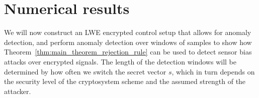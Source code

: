 \documentclass[journal, twoside, web]{ieeecolorpreprint}
\newtheorem{prop}{Proposition}
\begin{document}
%

\section{Numerical results} \label{sec:numerical}

We will now construct an LWE encrypted control setup that allows for anomaly detection, and perform anomaly detection over windows of samples to show how Theorem~\ref{thm:main_theorem_rejection_rule} can be used to detect sensor bias attacks over encrypted signals. The length of the detection windows will be determined by how often we switch the secret vector $s$, which in turn depends on the security level of the cryptosystem scheme and the assumed strength of the attacker.


\end{document}
